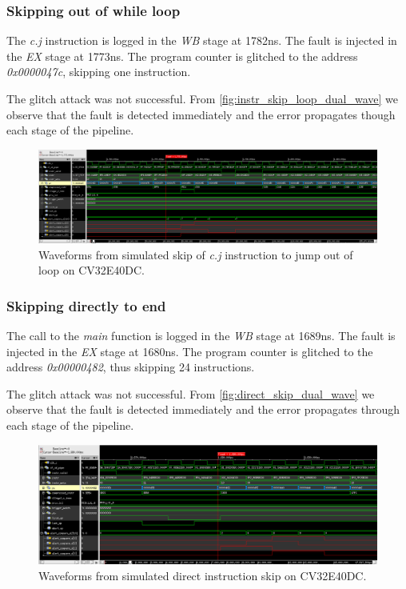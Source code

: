 \subsubsection{Skipping out of while loop}

The \textit{c.j} instruction is logged in the \textit{WB} stage at 1782ns. The fault is injected in the \textit{EX} stage at 1773ns. The program counter is glitched to the address \textit{0x0000047c}, skipping one instruction.

The glitch attack was not successful. From \autoref{fig:instr_skip_loop_dual_wave} we observe that the fault is detected immediately and the error propagates though each stage of the pipeline. 

\begin{figure}[h!]
    \centering
    \includegraphics[width=\textwidth]{docs/images/instr_skip_loop_dual_core.png}
    \caption{Waveforms from simulated skip of \textit{c.j} instruction to jump out of loop on CV32E40DC.}
    \label{fig:instr_skip_loop_dual_wave}
\end{figure}

\subsubsection{Skipping directly to end}

The call to the \textit{main} function is logged in the \textit{WB} stage at 1689ns. The fault is injected in the \textit{EX} stage at 1680ns. The program counter is glitched to the address \textit{0x00000482}, thus skipping 24 instructions.

The glitch attack was not successful. From \autoref{fig:direct_skip_dual_wave} we observe that the fault is detected immediately and the error propagates through each stage of the pipeline. 

\begin{figure}[h!]
    \centering
    \includegraphics[width=\textwidth]{docs/images/direct_skip_dual_core.png}
    \caption{Waveforms from simulated direct instruction skip on CV32E40DC.}
    \label{fig:direct_skip_dual_wave}
\end{figure}


